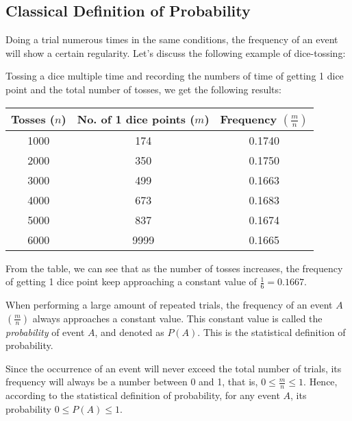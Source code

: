 \documentclass{report}
\begin{document}
\begin{multicols}{2}
  \subsection*{Classical Definition of Probability}

  Doing a trial numerous times in the same conditions, the frequency of an event
  will show a certain regularity. Let's discuss the following example of
  dice-tossing:

  Tossing a dice multiple time and recording the numbers of time of getting 1
  dice point and the total number of tosses, we get the following results:

  \begin{center}
    \begin{tabular}{|c|c|c|}
      \hline
      Tosses ($n$) & No. of 1 dice points ($m$) & Frequency $\left(\frac{m}{n}\right)$ \\
      \hline
      1000         & 174                        & 0.1740                               \\
      2000         & 350                        & 0.1750                               \\
      3000         & 499                        & 0.1663                               \\
      4000         & 673                        & 0.1683                               \\
      5000         & 837                        & 0.1674                               \\
      6000         & 9999                       & 0.1665                               \\
      \hline
    \end{tabular}
  \end{center}

  From the table, we can see that as the number of tosses increases, the
  frequency of getting 1 dice point keep approaching a constant value of
  $\frac{1}{6} = 0.1667$.

  When performing a large amount of repeated trials, the frequency of an event
  $A$ $\left(\frac{m}{n}\right)$ always approaches a constant value. This
  constant value is called the \emph{probability} of event $A$, and denoted as
  $P(A)$. This is the statistical definition of probability.

  Since the occurrence of an event will never exceed the total number of trials,
  its frequency will always be a number between 0 and 1, that is, $0 \leq
    \frac{m}{n} \leq 1$. Hence, according to the statistical definition of
  probability, for any event $A$, its probability $0 \leq P(A) \leq 1$.


\end{multicols}
\end{document}
